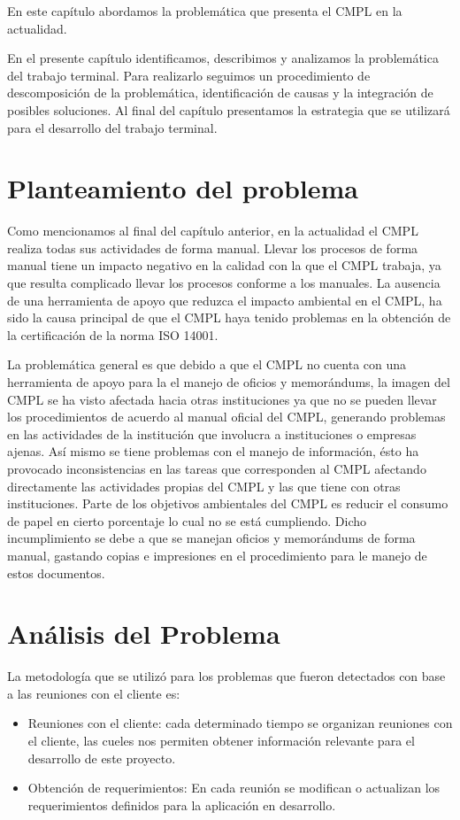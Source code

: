 En este capítulo abordamos la problemática que presenta el CMPL en la actualidad. 

En el presente capítulo identificamos, describimos y analizamos la problemática del trabajo terminal. Para realizarlo seguimos un procedimiento de descomposición de la problemática, identificación de causas y la integración de posibles soluciones. Al final del capítulo presentamos la estrategia que se utilizará para el desarrollo del trabajo terminal. 
\section{Planteamiento del problema}
Como mencionamos al final del capítulo anterior, en la actualidad el CMPL realiza todas sus actividades de forma manual. Llevar los procesos de forma manual tiene un impacto negativo en la calidad con la que el CMPL trabaja, ya que resulta complicado llevar los procesos conforme a los manuales. La ausencia de una herramienta de apoyo que reduzca el impacto ambiental en el CMPL, ha sido la causa principal de que el CMPL haya tenido problemas en la obtención de la certificación de la norma ISO 14001. 

La problemática general es que debido a que el CMPL no cuenta con una herramienta de apoyo para la el manejo de oficios y memorándums, la imagen del CMPL se ha visto afectada hacia otras instituciones ya que no se pueden llevar los procedimientos de acuerdo al manual oficial del CMPL, generando problemas en las actividades de la institución que involucra a instituciones o empresas ajenas. Así mismo se tiene problemas con el manejo de información, ésto ha provocado inconsistencias en las tareas que corresponden al CMPL afectando directamente las actividades propias del CMPL y las que tiene con otras instituciones. Parte de los objetivos ambientales del CMPL es reducir el consumo de papel en cierto porcentaje lo cual no se está cumpliendo. Dicho incumplimiento se debe a que se manejan oficios y memorándums de forma manual, gastando copias e impresiones en el procedimiento para le manejo de estos documentos.

\section{Análisis del Problema}
La metodología que se utilizó para los problemas que fueron detectados con base a las reuniones con el cliente es:
	\begin{itemize}
		\item Reuniones con el cliente: cada determinado tiempo se organizan reuniones con el cliente, las cueles nos permiten obtener información relevante para el desarrollo de este proyecto.
		\item Obtención de requerimientos: En cada reunión se modifican o actualizan los requerimientos definidos para la aplicación en desarrollo.
	\end{itemize}

